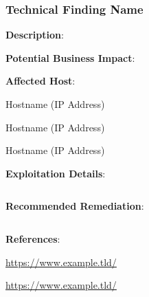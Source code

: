
\subsubsection{Technical Finding Name}

\label{sec:finding_template}
\noindent


\noindent


\color{black}{}
\textbf{Description}:
    

\noindent
\textbf{Potential Business Impact}:
    


\noindent
\textbf{Affected Host}:

    Hostname (IP Address)
    
    Hostname (IP Address)
    
    Hostname (IP Address)

\noindent
\textbf{Exploitation Details}:
    

\begin{lstlisting}[language=bash,frame=single,showstringspaces=false]

\end{lstlisting}


\noindent
\textbf{Recommended Remediation}:
    

\begin{lstlisting}[language=bash,frame=single,showstringspaces=false]

\end{lstlisting}

    

\noindent
\textbf{References}:

    \url{https://www.example.tld/}
    
    \url{https://www.example.tld/}


\newpage